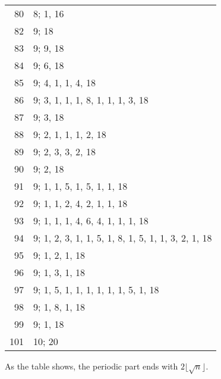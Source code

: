 \documentclass[12pt]{article}
\begin{document}
\begin{tabular}{|r|l|}
80 & 8; 1, 16 \\
82 & 9; 18 \\
83 & 9; 9, 18 \\
84 & 9; 6, 18 \\
85 & 9; 4, 1, 1, 4, 18 \\
86 & 9; 3, 1, 1, 1, 8, 1, 1, 1, 3, 18 \\
87 & 9; 3, 18 \\
88 & 9; 2, 1, 1, 1, 2, 18 \\
89 & 9; 2, 3, 3, 2, 18 \\
90 & 9; 2, 18 \\
91 & 9; 1, 1, 5, 1, 5, 1, 1, 18 \\
92 & 9; 1, 1, 2, 4, 2, 1, 1, 18 \\
93 & 9; 1, 1, 1, 4, 6, 4, 1, 1, 1, 18 \\
94 & 9; 1, 2, 3, 1, 1, 5, 1, 8, 1, 5, 1, 1, 3, 2, 1, 18 \\
95 & 9; 1, 2, 1, 18 \\
96 & 9; 1, 3, 1, 18 \\
97 & 9; 1, 5, 1, 1, 1, 1, 1, 1, 5, 1, 18 \\
98 & 9; 1, 8, 1, 18 \\
99 & 9; 1, 18 \\
101 & 10; 20 \\
\end{tabular}

As the table shows, the periodic part ends with $2 \lfloor \sqrt{n} \rfloor$.
\end{document}
